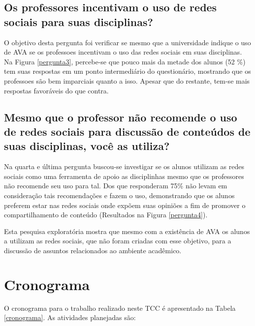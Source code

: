 \subsection*{Os professores incentivam o uso de redes sociais para suas disciplinas?}

O objetivo desta pergunta foi verificar se mesmo que a universidade indique o uso de AVA se os professoes incentivam o uso das redes sociais em suas disciplinas. Na Figura \ref{pergunta3}, percebe-se que pouco mais da metade dos alunos (52 \%) tem suas respostas em um ponto intermediário do questionário, mostrando que os professoes são bem imparciais quanto a isso. Apesar que do restante, tem-se mais respostas favoráveis do que contra.

\subsection*{Mesmo que o professor não recomende o uso de redes sociais para discussão de conteúdos de suas disciplinas, você as utiliza?}

Na quarta e última pergunta buscou-se investigar se os alunos utilizam as redes sociais como uma ferramenta de apoio as disciplinhas mesmo que os professores não recomende seu uso para tal. Dos que responderam 75\% não levam em consideração tais recomendações e fazem o uso, demonstrando que os alunos preferem estar nas redes sociais onde expõem suas opiniões a fim de promover o compartilhamento de conteúdo (Resultados na Figura \ref{pergunta4}).

Esta pesquisa exploratória mostra que mesmo com a existência de AVA os alunos a utilizam as redes sociais, que não foram criadas com esse objetivo, para a discussão de assuntos relacionados ao ambiente acadêmico.

\section{Cronograma}

O cronograma para o trabalho realizado neste TCC é apresentado na Tabela \ref{cronograma}. As atividades planejadas são:

